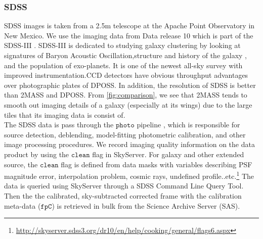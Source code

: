 \documentclass[5p]{elsarticle}
\begin{document}
	\subsubsection{SDSS}
	SDSS images is taken from a 	2.5m telescope at the Apache Point Observatory in New Mexico. We use the imaging data from Data release 10 which is part of the SDSS-III . SDSS-III is dedicated to studying galaxy clustering by looking at signatures of Baryon Acoustic Oscillation,structure and history of the galaxy , and the population of exo-planets. %
	 It is  one of the newest all-sky survey with improved instrumentation.CCD detectors have obvious throughput advantages over photographic plates of DPOSS. In addition, the resolution of SDSS is better than 2MASS and DPOSS.  From \autoref{fig:comparison}, we see that 2MASS tends to smooth out imaging details of a galaxy (especially at its wings)  due to the large tiles that its imaging data is consist of.
\\
\indent The SDSS data is pass through the $\texttt{photo}$ pipeline%
	 , which is responsible for source detection, deblending, model-fitting photometric calibration, and other image processing procedures. We record imaging quality information on the data product by using the $\texttt{clean}$ flag in SkyServer. For galaxy and other extended source, the $\texttt{clean}$ flag is defined from data masks with variables describing PSF magnitude error,  interpolation problem,  cosmic rays, undefined profile..etc.\footnote{\url{http://skyserver.sdss3.org/dr10/en/help/cooking/general/flags6.aspx}}
The data is queried using SkyServer through a SDSS Command Line Query Tool. Then the the calibrated, sky-subtracted corrected frame with the calibration meta-data ($\texttt{fpC}$) is retrieved in bulk from the Science Archive Server (SAS). 
\end{document}
